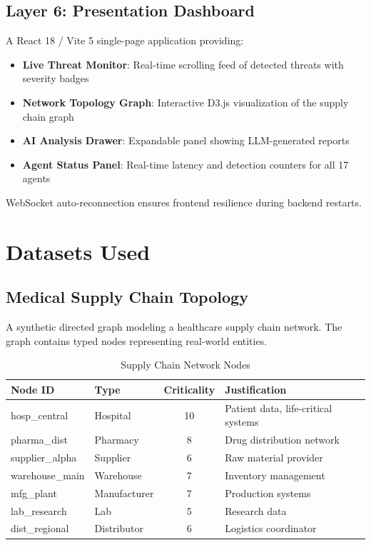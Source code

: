 \documentclass[12pt, a4paper]{report}
\begin{document}
\subsection{Layer 6: Presentation Dashboard}

A React 18 / Vite 5 single-page application providing:
\begin{itemize}
    \item \textbf{Live Threat Monitor}: Real-time scrolling feed of detected threats with severity badges
    \item \textbf{Network Topology Graph}: Interactive D3.js visualization of the supply chain graph
    \item \textbf{AI Analysis Drawer}: Expandable panel showing LLM-generated reports
    \item \textbf{Agent Status Panel}: Real-time latency and detection counters for all 17 agents
\end{itemize}

WebSocket auto-reconnection ensures frontend resilience during backend restarts.

\section{Datasets Used}

\subsection{Medical Supply Chain Topology}

A synthetic directed graph modeling a healthcare supply chain network. The graph contains typed nodes representing real-world entities.

\begin{table}[H]
\centering
\caption{Supply Chain Network Nodes}
\label{tab:nodes}
\begin{tabular}{l l c l}
\toprule
\textbf{Node ID} & \textbf{Type} & \textbf{Criticality} & \textbf{Justification} \\
\midrule
hosp\_central & Hospital & 10 & Patient data, life-critical systems \\
pharma\_dist & Pharmacy & 8 & Drug distribution network \\
supplier\_alpha & Supplier & 6 & Raw material provider \\
warehouse\_main & Warehouse & 7 & Inventory management \\
mfg\_plant & Manufacturer & 7 & Production systems \\
lab\_research & Lab & 5 & Research data \\
dist\_regional & Distributor & 6 & Logistics coordinator \\
\bottomrule
\end{tabular}
\end{table}
\end{document}
